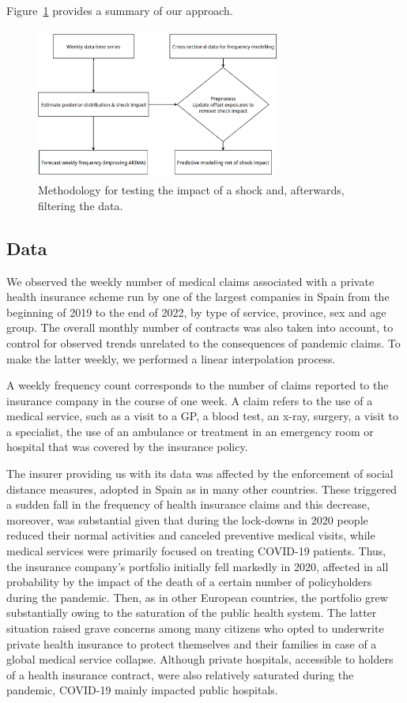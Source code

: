 \documentclass[]{risa}
\begin{document}
Figure~\ref{fig1} provides a summary of our approach.
\begin{center}
  \begin{figure}[ht]
    \includegraphics[width=8cm, height=5cm]{Diagrama1.png}\caption{Methodology for testing the impact of a shock and, afterwards, filtering the data.}\label{fig1}
  \end{figure}
	\end{center}
	

\subsection{Data}\label{data}
We observed the weekly number of medical claims associated with a private health insurance scheme run by one of the largest companies in Spain from the beginning of 2019 to the end of 2022, by type of service, province, sex and age group. The overall monthly number of contracts was also taken into account, to control for observed trends unrelated to the consequences of pandemic claims. To make the latter weekly, we performed a linear interpolation process.

A weekly frequency count corresponds to the number of claims reported to the insurance company in the course of one week. A claim refers to the use of a medical service, such as a visit to a GP, a blood test, an x-ray, surgery, a visit to a specialist, the use of an ambulance or treatment in an emergency room or hospital that was covered by the insurance policy.

The insurer providing us with its data was affected by the enforcement of social distance measures, adopted in Spain as in many other countries. These triggered a sudden fall in the frequency of health insurance claims and this decrease, moreover, was substantial given that during the lock-downs in 2020 people reduced their normal activities and canceled preventive medical visits, while medical services were primarily focused on treating COVID-19 patients. Thus, the insurance company’s portfolio initially fell markedly in 2020, affected in all probability by the impact of the death of a certain number of policyholders during the pandemic. Then, as in other European countries, the portfolio grew substantially owing to the saturation of the public health system. The latter situation raised grave concerns among many citizens who opted to underwrite private health insurance to protect themselves and their families in case of a global medical service collapse. Although private hospitals, accessible to holders of a health insurance contract, were also relatively saturated during the pandemic, COVID-19 mainly impacted public hospitals.
\end{document}
